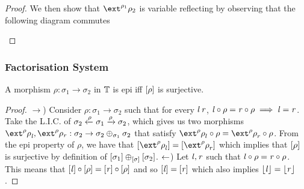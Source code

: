 \begin{proof}
    We then show that $\ext^{\rho_1}\rho_2$ is variable reflecting by observing that the following diagram commutes
    \begin{center}
    \end{center}\vspace{-1.5\baselineskip}
\end{proof}

\subsubsection{Factorisation System}

\begin{lemma}\label{lem:epis-T}
   A morphism $\rho : \sigma_1 \to \sigma_2$ in $\mathbb{T}$ is epi iff $[\rho]$ is surjective.
\end{lemma}
\begin{proof}\nl
    $\to$) Consider $\rho : \sigma_1 \to \sigma_2$ such that for every $\mathit{l}\,\mathit{r}$, $\mathit{l} \circ \rho = \mathit{r} \circ \rho \implies \mathit{l} = \mathit{r}$.
           Take the L.I.C. of $\sigma_2 \xleftarrow\rho \sigma_1 \xrightarrow\rho \sigma_2$, which gives us two morphisms ${\ext^\rho\rho}_\vl, \ext^\rho\rho_\vr : \sigma_2 \to \sigma_2 \liplus{\sigma_1} \sigma_2$
           that satisfy ${\ext^\rho\rho}_l \comp \rho = {\ext^\rho\rho}_r \comp \rho$.
           From the epi property of $\rho$, we have that $\anyL{{\ext^\rho\rho}_l} = \anyL{{\ext^\rho\rho}_r}$ which implies that $[\rho]$ is surjective by definition of $[\sigma_1] \oplus_{[\sigma]} [\sigma_2]$.
    \nl
    $\leftarrow$) Let $\mathit{l}, \mathit{r}$ such that $\mathit{l} \circ \rho = \mathit{r} \circ \rho$.
             This means that $[\mathit{l}] \circ [\rho] = [\mathit{r}] \circ [\rho]$ and so $[\mathit{l}] = [\mathit{r}]$ which also implies $\lfloor\mathit{l}\rfloor = \lfloor\mathit{r}\rfloor$.
\end{proof}

